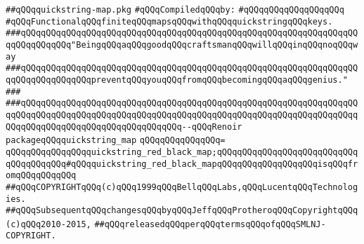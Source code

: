 \label{src/lib/src/quickstring-map.pkg}
\verb|##qQQqquickstring-map.pkg|\newline
\newline
\verb|#qQQqCompiledqQQqby:|\newline
\verb|#qQQqqQQqqQQqqQQqqQQq|\newline
\newline
\verb|#qQQqFunctionalqQQqfiniteqQQqmapsqQQqwithqQQqquickstringqQQqkeys.|\newline
\newline
\newline
\newline
\verb|###qQQqqQQqqQQqqQQqqQQqqQQqqQQqqQQqqQQqqQQqqQQqqQQqqQQqqQQqqQQqqQQqqQQqqQQqqQQqqQQq"BeingqQQqaqQQqgoodqQQqcraftsmanqQQqwillqQQqinqQQqnoqQQqway|\newline
\verb|###qQQqqQQqqQQqqQQqqQQqqQQqqQQqqQQqqQQqqQQqqQQqqQQqqQQqqQQqqQQqqQQqqQQqqQQqqQQqqQQqqQQqpreventqQQqyouqQQqfromqQQqbecomingqQQqaqQQqgenius."|\newline
\verb|###|\newline
\verb|###qQQqqQQqqQQqqQQqqQQqqQQqqQQqqQQqqQQqqQQqqQQqqQQqqQQqqQQqqQQqqQQqqQQqqQQqqQQqqQQqqQQqqQQqqQQqqQQqqQQqqQQqqQQqqQQqqQQqqQQqqQQqqQQqqQQqqQQqqQQqqQQqqQQqqQQqqQQqqQQqqQQqqQQqqQQq--qQQqRenoir|\newline
\newline
\newline
\newline
\verb|packageqQQqquickstring_map|\newline
\verb|qQQqqQQqqQQqqQQq=|\newline
\verb|qQQqqQQqqQQqqQQqquickstring_red_black_map;qQQqqQQqqQQqqQQqqQQqqQQqqQQqqQQqqQQqqQQq#qQQqquickstring_red_black_mapqQQqqQQqqQQqqQQqqQQqisqQQqfromqQQqqQQqqQQq|\newline
\newline
\newline
\verb|##qQQqCOPYRIGHTqQQq(c)qQQq1999qQQqBellqQQqLabs,qQQqLucentqQQqTechnologies.|\newline
\verb|##qQQqSubsequentqQQqchangesqQQqbyqQQqJeffqQQqProtheroqQQqCopyrightqQQq(c)qQQq2010-2015,|\newline
\verb|##qQQqreleasedqQQqperqQQqtermsqQQqofqQQqSMLNJ-COPYRIGHT.|\newline

